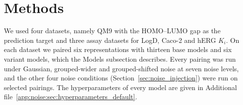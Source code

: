 \section{Methods}\label{sec:robustness:methods}

We used four datasets, namely QM9 with the HOMO--LUMO gap as the prediction target and three assay datasets for LogD, Caco-2 and hERG $K_i$. On each dataset we paired six representations with thirteen base models and six variant models, which the Models subsection describes. Every pairing was run under Gaussian, grouped-wider and grouped-shifted noise at seven noise levels, and the other four noise conditions (Section~\ref{sec:noise_injection}) were run on selected pairings. The hyperparameters of every model are given in Additional file~\ref{app:noise:sec:hyperparameters_default}.



